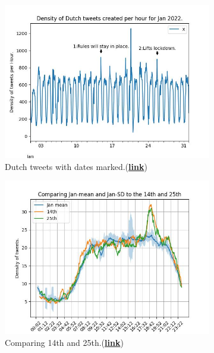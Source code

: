 \documentclass[10pt]{article}
\begin{document}
\begin{figure}[h!]
    \center
    \begin{subfigure}[b]{0.45\textwidth}
        \center
        \includegraphics[scale=0.45]{figures/figNL60AnnoAX.jpeg}
        \caption{Dutch tweets with dates  marked.(\href{https://github.com/JamesZor/data-WranglingProject/blob/main/figures/figNL60AnnoAX.jpeg}{\color{blue}\textbf{link}})}
        \label{fig:3a}
    \end{subfigure}
    \begin{subfigure}[b]{0.45\textwidth}
        \center
        \includegraphics[scale=0.45]{figures/figNLComp.jpeg}
        \caption{Comparing 14th and 25th.(\href{https://github.com/JamesZor/data-WranglingProject/blob/main/figures/figNLComp.jpeg}{\color{blue}\textbf{link}})}
        \label{fig:3b}
    \end{subfigure}
    \caption{}
    \label{fig:3g}
\end{figure}
\end{document}
